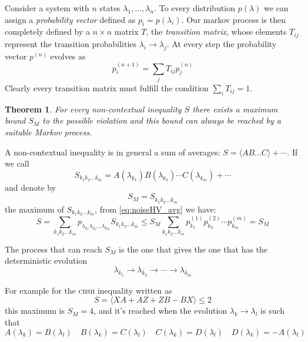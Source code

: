 \documentclass[a4paper]{article}
\newcommand{\acron}[1]{\textsc{#1}}
\newtheorem{theorem}{Theorem}[section]
\theoremstyle{definition}
\let\oldproof\proof
\let\oldendproof\endproof
\renewenvironment{proof}
    {
        \begin{framed} 
        \oldproof
    }
    {
        \oldendproof 
        \end{framed}
    }
\begin{document}
Consider a system with $n$ states $\lambda_1,\ldots,\lambda_n$. 
To every distribution $p(\lambda)$ we can assign a \emph{probability vector} defined as
$p_i = p(\lambda_i)$.
Our markov process is then completely defined by a $n\times n$ matrix $T$, the
\emph{transition matrix}, whose elements $T_{ij}$ represent the transition
probabilities $\lambda_i \rightarrow \lambda_j$.
At every step the probability vector $p^{(n)}$ evolves as
\begin{equation}
    p_i^{(n+1)} = \sum_j T_{ij} p_j^{(n)}
    \label{eq:markov_evolution}
\end{equation}
Clearly every transition matrix must fulfill the condition $\sum_i T_{ij} = 1$.

\begin{theorem}
    For every non-contextual inequality $S$ there exists a maximum bound $S_{M}$ to the
    possible violation and this bound can always be reached by a suitable Markov process.
    \label{th:noise_max_violation}
\end{theorem}
\begin{proof}
    A non-contextual inequality is in general a sum of averages:
    $S = \langle{AB\ldots C}\rangle + \cdots$.
    If we call
    \begin{equation}
        S_{k_1 k_2 \ldots k_m} =
        A(\lambda_{k_1})B(\lambda_{k_2})\cdots C(\lambda_{k_m}) + \cdots
    \end{equation}
    and denote by
    \begin{equation}
         S_M = S_{\bar k_1 \bar k_2 \ldots \bar k_m}
        \label{eq:max_ineq_S}
    \end{equation}
    the maximum of $S_{k_1k_2\ldots k_m}$, from \eqref{eq:noiseHV_avg} we have:
    \begin{equation}
        S=
        \sum_{k_1 k_2\ldots k_m} p_{\lambda_{k_1}\lambda_{k_2}\ldots\lambda_{k_m}}S_{k_1 k_2 \ldots k_m} \le 
        S_M \sum_{k_1 k_2\ldots k_m} p_{k_1}^{(1)} p_{k_2}^{(2)} \cdots
        p_{k_m}^{(m)} = S_M
    \end{equation}
    
    The process that can reach $S_M$ is the one that gives the one that has
    the deterministic evolution
    \begin{equation}
        \lambda_{\bar k_1} \rightarrow \lambda_{\bar k_2} \rightarrow \cdots
        \rightarrow \lambda_{\bar k_m}
    \end{equation}
\end{proof}

For example for the \acron{chsh} inequality written as
\begin{equation}
    S = \langle{XA + AZ + ZB - BX}\rangle \le 2
    \label{eq:CHSH_maxS}
\end{equation}
this maximum is $S_M = 4$, and it's
reached when the evolution $\lambda_k \rightarrow \lambda_l$ is such that
\begin{equation}
    A(\lambda_k)=B(\lambda_l) \quad B(\lambda_k)=C(\lambda_l)
    \quad C(\lambda_k)= D(\lambda_l) \quad D(\lambda_k)= - A(\lambda_l)
    \label{eq:maxS_CHSH}
\end{equation}
\end{document}
